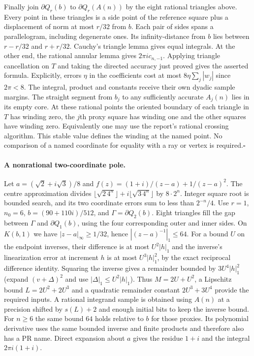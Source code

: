 Finally join $\partial Q_r(b)$ to $\partial Q_r(A(n))$ by the eight rational triangles above. Every point in these triangles is a side point of the reference square plus a displacement of norm at most $r/32$ from $b$. Each pair of sides spans a parallelogram, including degenerate ones. Its infinity-distance from $b$ lies between $r-r/32$ and $r+r/32$. Cauchy's triangle lemma gives equal integrals. At the other end, the rational annular lemma gives $2\pi i c_{n,-1}$. Applying triangle cancellation on $T$ and taking the directed accuracy just proved gives the asserted formula. Explicitly, errors $\eta$ in the coefficients cost at most $8\eta\sum_j|w_j|$ since $2\pi<8$. The integral, product and constants receive their own dyadic sample margins. The straight segment from $b_j$ to any sufficiently accurate $A_j(n)$ lies in its empty core. At these rational points the oriented boundary of each triangle in $T$ has winding zero, the $j$th proxy square has winding one and the other squares have winding zero. Equivalently one may use the report's rational crossing algorithm. This stable value defines the winding at the named point. No comparison of a named coordinate for equality with a ray or vertex is required.\hfill$\square$

\paragraph{A nonrational two-coordinate pole.}
Let $a=(\sqrt 2+i\sqrt 3)/8$ and
$f(z)=(1+i)/(z-a)+1/(z-a)^2$. The centre approximation divides
$\lfloor\sqrt{2\,4^n}\rfloor+i\lfloor\sqrt{3\,4^n}\rfloor$ by $8\cdot2^n$. Integer square root is bounded search, and its two coordinate errors sum to less than $2^{-n}/4$. Use $r=1$, $n_0=6$, $b=(90+110i)/512$, and $\Gamma=\partial Q_2(b)$. Eight triangles fill the gap between $\Gamma$ and $\partial Q_1(b)$, using the four corresponding outer and inner sides. On $K(b,1)$ we have $|z-a|_\infty\ge1/32$, hence $|(z-a)^{-1}|_1\le64$. For a bound $U$ on the endpoint inverses, their difference is at most $U^2|h|_1$ and the inverse's linearization error at increment $h$ is at most $U^3|h|_1^2$, by the exact reciprocal difference identity. Squaring the inverse gives a remainder bounded by $3U^4|h|_1^2$ (expand $(v+\Delta)^2$ and use $|\Delta|_1\le U^2|h|_1$). Thus $M=2U+U^2$, a Lipschitz bound $L=2U^2+2U^3$ and a quadratic remainder constant $2U^3+3U^4$ provide the required inputs. A rational integrand sample is obtained using $A(n)$ at a precision shifted by $s(L)+2$ and enough initial bits to keep the inverse bound. For $n\ge6$ the same bound $64$ holds relative to $b$ for those proxies. Its polynomial derivative uses the same bounded inverse and finite products and therefore also has a PR name. Direct expansion about $a$ gives the residue $1+i$ and the integral $2\pi i(1+i)$.


